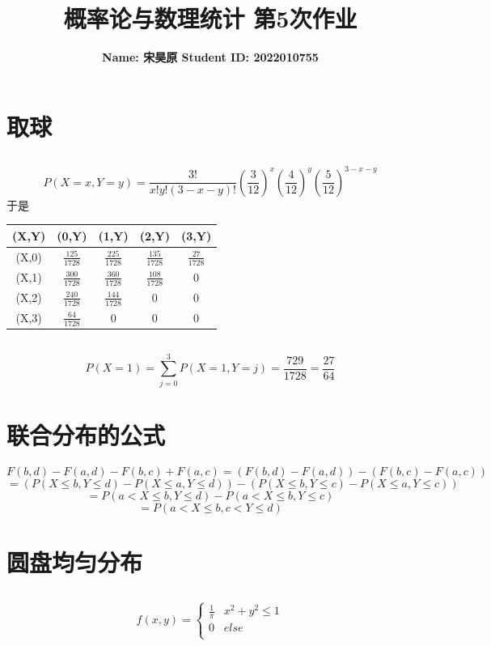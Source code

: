\documentclass{article}
\title{\bf\Large  概率论与数理统计 第5次作业}
\author{\bf Name: 宋昊原 \qquad Student ID: 2022010755}
\begin{document}
\begin{CJK}{UTF8}{gbsn}
\maketitle
\section{取球}
\subsection{}
$$ P(X=x,Y=y)=\frac{3!}{x!y!(3-x-y)!}(\frac{3}{12})^{x}(\frac{4}{12})^{y}(\frac{5}{12})^{3-x-y}$$
于是\\
\begin{tabular}{c|c|c|c|c}
	(X,Y) & (0,Y) & (1,Y) & (2,Y) & (3,Y)\\
	\hline
	(X,0) & $\frac{125}{1728}$ & $\frac{225}{1728}$ & $\frac{135}{1728}$ & $\frac{27}{1728}$\\
    \hline
    (X,1) & $\frac{300}{1728}$ & $\frac{360}{1728}$ & $\frac{108}{1728}$ & $0$\\
    \hline
    (X,2) & $\frac{240}{1728}$ & $\frac{144}{1728}$ & $0$ & $0$\\
    \hline
    (X,3) & $\frac{64}{1728}$ & $0$ & $0$ & $0$\\
    \hline
\end{tabular}
\subsection{}
$$ P(X=1)=\sum\limits_{j=0}^{3}P(X=1,Y=j)=\frac{729}{1728}=\frac{27}{64}$$
\section{联合分布的公式}
$$ F(b,d)-F(a,d)-F(b,c)+F(a,c)=(F(b,d)-F(a,d))-(F(b,c)-F(a,c))$$
$$ =(P(X\leq b,Y\leq d)-P(X\leq a,Y\leq d))-(P(X\leq b,Y\leq c)-P(X\leq a,Y\leq c))$$
$$ =P(a<X\leq b,Y\leq d)-P(a<X\leq b,Y\leq c)$$
$$ =P(a<X\leq b,c<Y\leq d)$$
\section{圆盘均匀分布}
\subsection{}
\begin{equation}
    f(x,y)=\left\{
    \begin{array}{cl}
    \frac{1}{\pi} & x^{2}+y^{2}\leq 1\\
    0 & else\\
    \end{array}\right.
\end{equation}

\end{CJK}
\end{document}
